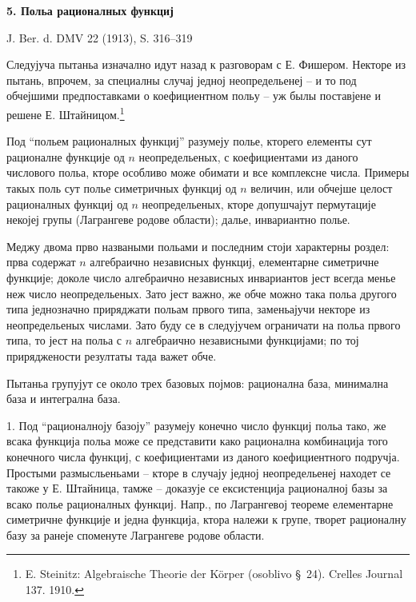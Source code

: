 \documentclass[11pt]{article}
\begin{document}
\begin{center}
{\Large\bfseries 5. Польа рационалных функциј}\par
\vspace{1.2em}
J. Ber. d. DMV 22 (1913), S. 316--319
\end{center}

\vspace{2em}

Следујуча пытаньа изначално идут назад к разговорам с Е. Фишером. Некторе из пытань, впрочем, за специалны случај једној неопредельенеј -- и то под обчејшими предпоставками о коефициентном польу -- уж былы поставјене и решене Е. Штайницом.\footnote{E. Steinitz: Algebraische Theorie der Körper (osoblivo \S\ 24). Crelles Journal 137. 1910.}

Под ``польем рационалных функциј'' разумеју полье, кторего елементы сут рационалне функције од $n$ неопредельеных, с коефициентами из даного числового польа, кторе особливо може обимати и все комплексне числа. Примеры такых поль сут полье симетричных функциј од $n$ величин, или обчејше целост рационалных функциј од $n$ неопредельеных, кторе допушчајут пермутације некојеј групы (Лагрангеве родове области); далье, инвариантно полье.

Меджу двома прво назваными польами и последним стоји характерны роздел: прва содержат $n$ алгебраично независных функциј, елементарне симетричне функције; доколе число алгебраично независных инвариантов јест всегда менье неж число неопредельеных. Зато јест важно, же обче можно така польа другого типа једнозначно приряджати польам првого типа, заменьајучи некторе из неопредельеных числами. Зато буду се в следујучем ограничати на польа првого типа, то јест на польа с $n$ алгебраично независными функцијами; по тој приряджености резултаты тада важет обче.

Пытаньа групујут се около трех базовых појмов: рационална база, минимална база и интегрална база.

1. Под ``рационалноју базоју'' разумеју конечно число функциј польа тако, же всака функција польа може се представити како рационална комбинација того конечного числа функциј, с коефициентами из даного коефициентного подручја. Простыми размысльеньами -- кторе в случају једној неопредельенеј находет се такоже у Е. Штайница, тамже -- доказује се ексистенција рационалној базы за всако полье рационалных функциј. Напр., по Лагрангевој теореме елементарне симетричне функције и једна функција, ктора належи к групе, творет рационалну базу за ранеје споменуте Лагрангеве родове области.
\end{document}
